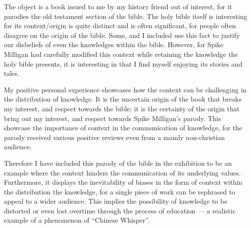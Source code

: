 \documentclass[a4paper,11pt]{article}
\begin{document}
The object is a book issued to me by my history friend out of interest, for it parodies the old testament section of the bible. The holy bible itself is interesting for its context/origin is quite distinct and is often significant, for people often disagree on the origin of the bible. Some, and I included use this fact to justify our disbeliefs of even the knowledges within the bible. However, for Spike Milligan had carefully modified this context while retaining the knowledge the holy bible presents, it is interesting in that I find myself enjoying its stories and tales.

My positive personal experience showcases how the context can be challenging in the distribution of knowledge. It is the uncertain origin of the book that breaks my interest, and respect towards the bible; it is the certainty of the origin that bring out my interest, and respect towards Spike Milligan's parody. This showcase the importance of context in the communication of knowledge, for the parody received various positive reviews even from a mainly non-christian audience.




Therefore I have included this parody of the bible in the exhibition to be an example where the context hinders the communication of its underlying values. Furthermore, it displays the inevitability of biases in the form of context within the distribution the knowledge, for a single piece of work can be rephrased to appeal to a wider audience. This implies the possibility of knowledge to be distorted or even lost overtime through the process of education --- a realistic example of a phenomenon of ``Chinese Whisper''.
\end{document}
